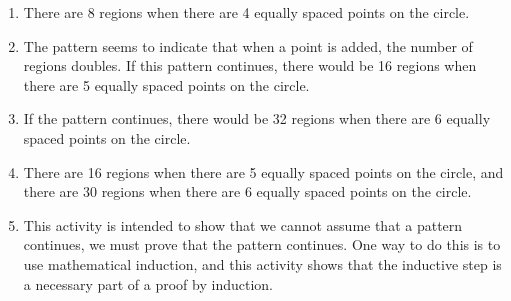 \documentclass[11pt]{article}
\begin{document}
\setcounter{equation}{0}
\begin{enumerate}
\item There are 8 regions when there are 4 equally spaced points on the circle.

\item The pattern seems to indicate that when a point is added, the number of regions doubles.  If this pattern continues, there would be 16 regions when there are 5 equally spaced points on the circle.

\item If the pattern continues, there would be 32 regions when there are 6 equally spaced points on the circle.

\item There are 16 regions when there are 5 equally spaced points on the circle, and there are 30 
regions when there are 6 equally spaced points on the circle.

\item This activity is intended to show that we cannot assume that a pattern continues, we must prove that the pattern continues.  One way to do this is to use mathematical induction, and this activity shows that the inductive step is a necessary part of a proof by induction.

\end{enumerate}
\end{document}
